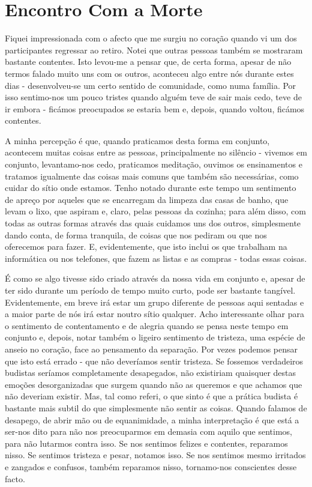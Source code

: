 \chapter{Encontro Com a Morte}

Fiquei impressionada com o afecto que me surgiu no coração quando vi um
dos participantes regressar ao retiro. Notei que outras pessoas também
se mostraram bastante contentes. Isto levou-me a pensar que, de certa
forma, apesar de não termos falado muito uns com os outros, aconteceu
algo entre nós durante estes dias - desenvolveu-se um certo sentido de
comunidade, como numa família. Por isso sentimo-nos um pouco tristes
quando alguém teve de sair mais cedo, teve de ir embora - ficámos
preocupados se estaria bem e, depois, quando voltou, ficámos contentes.

A minha percepção é que, quando praticamos desta forma em conjunto,
acontecem muitas coisas entre as pessoas, principalmente no silêncio -
vivemos em conjunto, levantamo-nos cedo, praticamos meditação, ouvimos
os ensinamentos e tratamos igualmente das coisas mais comuns que também
são necessárias, como cuidar do sítio onde estamos. Tenho notado durante
este tempo um sentimento de apreço por aqueles que se encarregam da
limpeza das casas de banho, que levam o lixo, que aspiram e, claro,
pelas pessoas da cozinha; para além disso, com todas as outras formas
através das quais cuidamos uns dos outros, simplesmente dando conta, de
forma tranquila, de coisas que nos pediram ou que nos oferecemos para
fazer. E, evidentemente, que isto inclui os que trabalham na informática
ou nos telefones, que fazem as listas e as compras - todas essas coisas.

É como se algo tivesse sido criado através da nossa vida em conjunto e,
apesar de ter sido durante um período de tempo muito curto, pode ser
bastante tangível. Evidentemente, em breve irá estar um grupo diferente
de pessoas aqui sentadas e a maior parte de nós irá estar noutro sítio
qualquer. Acho interessante olhar para o sentimento de contentamento e
de alegria quando se pensa neste tempo em conjunto e, depois, notar
também o ligeiro sentimento de tristeza, uma espécie de anseio no
coração, face ao pensamento da separação. Por vezes podemos pensar que
isto está errado - que não deveríamos sentir tristeza. Se fossemos
verdadeiros budistas seríamos completamente desapegados, não existiriam
quaisquer destas emoções desorganizadas que surgem quando não as
queremos e que achamos que não deveriam existir. Mas, tal como referi, o
que sinto é que a prática budista é bastante mais subtil do que
simplesmente não sentir as coisas. Quando falamos de desapego, de abrir
mão ou de equanimidade, a minha interpretação é que está a ser-nos dito
para não nos preocuparmos em demasia com aquilo que sentimos, para não
lutarmos contra isso. Se nos sentimos felizes e contentes, \mbox{reparamos}
nisso. Se sentimos tristeza e pesar, notamos isso. Se nos sentimos mesmo
irritados e zangados e confusos, também reparamos nisso, tornamo-nos
conscientes desse facto.

